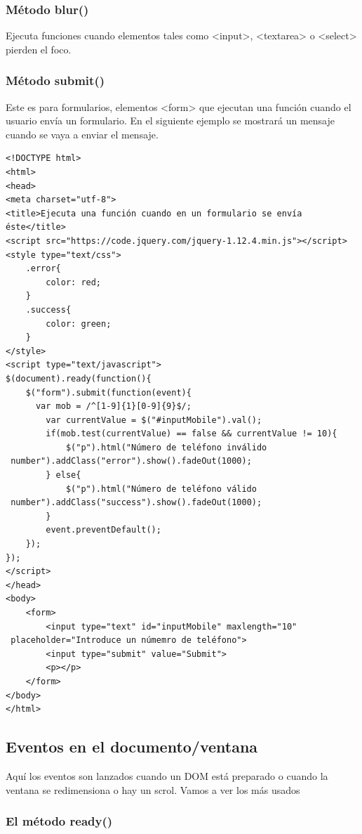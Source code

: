 \documentclass[a4paper, oneside]{article}
\begin{document}
\subsubsection{Método blur()}
\label{sec:org3c33cd9}

Ejecuta funciones cuando elementos tales como <input>, <textarea> o <select> pierden el foco.

\subsubsection{Método submit()}
\label{sec:orgc88c48d}
Este es para formularios, elementos <form> que ejecutan una función cuando el usuario envía un formulario. En el siguiente ejemplo se mostrará un mensaje cuando se vaya a enviar el mensaje.


\begin{verbatim}
<!DOCTYPE html>
<html>
<head>
<meta charset="utf-8">
<title>Ejecuta una función cuando en un formulario se envía éste</title>
<script src="https://code.jquery.com/jquery-1.12.4.min.js"></script>
<style type="text/css">
    .error{
        color: red;
    }
    .success{
        color: green;
    }
</style>
<script type="text/javascript">
$(document).ready(function(){
    $("form").submit(function(event){
      var mob = /^[1-9]{1}[0-9]{9}$/;
        var currentValue = $("#inputMobile").val();
        if(mob.test(currentValue) == false && currentValue != 10){
            $("p").html("Número de teléfono inválido
 number").addClass("error").show().fadeOut(1000);
        } else{
            $("p").html("Número de teléfono válido
 number").addClass("success").show().fadeOut(1000);
        }
        event.preventDefault();
    });
});
</script>
</head>
<body>
    <form>
        <input type="text" id="inputMobile" maxlength="10"
 placeholder="Introduce un númemro de teléfono">
        <input type="submit" value="Submit">
        <p></p>
    </form>
</body>
</html>                                		
\end{verbatim}

\subsection{Eventos en el documento/ventana}
\label{sec:org8309814}

Aquí los eventos son lanzados cuando un DOM está preparado o cuando la ventana se redimensiona o hay un scrol. Vamos a ver los más usados

\subsubsection{El método ready()}
\label{sec:org009af15}
\end{document}
